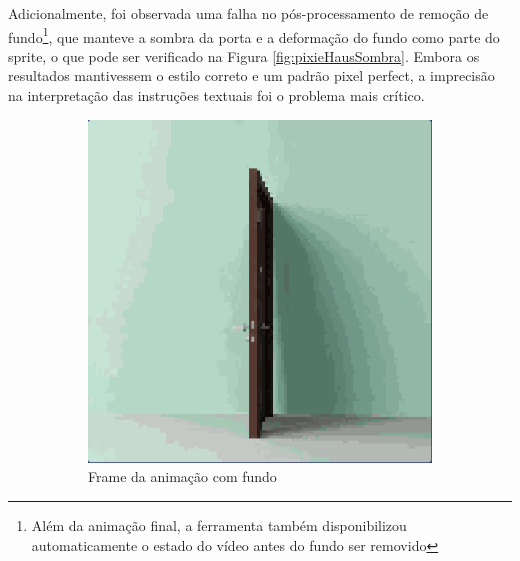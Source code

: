 Adicionalmente, foi observada uma falha no pós-processamento de remoção de fundo\footnote{Além da animação final, a ferramenta também disponibilizou automaticamente o estado do vídeo antes do fundo ser removido}, que manteve a sombra da porta e a deformação do fundo como parte do sprite, o que pode ser verificado na Figura \ref{fig:pixieHausSombra}. Embora os resultados mantivessem o estilo correto e um padrão pixel perfect, a imprecisão na interpretação das instruções textuais foi o problema mais crítico.

\begin{figure}[htbp]
    \centering
    \caption{\small Inclusão incorreta da sombra}
    \label{fig:pixieHausSombra}
    \begin{subfigure}{0.45\linewidth}
        \includegraphics[width=1\linewidth]{figs/pixieHaus/1sombraFundo.PNG}
        \caption{\small Frame da animação com fundo}
        \label{fig:pixieHausSombra1a}
    \end{subfigure}
    \begin{subfigure}{0.35\linewidth}

\end{subfigure}
\end{figure}
